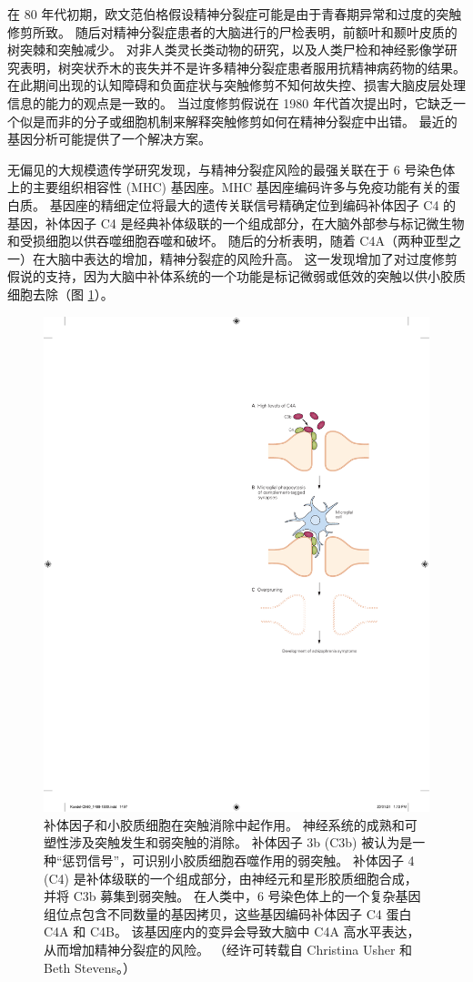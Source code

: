 在 80 年代初期，欧文范伯格假设精神分裂症可能是由于青春期异常和过度的突触修剪所致。 随后对精神分裂症患者的大脑进行的尸检表明，前额叶和颞叶皮质的树突棘和突触减少。 对非人类灵长类动物的研究，以及人类尸检和神经影像学研究表明，树突状乔木的丧失并不是许多精神分裂症患者服用抗精神病药物的结果。 在此期间出现的认知障碍和负面症状与突触修剪不知何故失控、损害大脑皮层处理信息的能力的观点是一致的。 当过度修剪假说在 1980 年代首次提出时，它缺乏一个似是而非的分子或细胞机制来解释突触修剪如何在精神分裂症中出错。 最近的基因分析可能提供了一个解决方案。

无偏见的大规模遗传学研究发现，与精神分裂症风险的最强关联在于 6 号染色体上的主要组织相容性 (MHC) 基因座。MHC 基因座编码许多与免疫功能有关的蛋白质。 基因座的精细定位将最大的遗传关联信号精确定位到编码补体因子 C4 的基因，补体因子 C4 是经典补体级联的一个组成部分，在大脑外部参与标记微生物和受损细胞以供吞噬细胞吞噬和破坏。 随后的分析表明，随着 C4A（两种亚型之一）在大脑中表达的增加，精神分裂症的风险升高。 
这一发现增加了对过度修剪假说的支持，因为大脑中补体系统的一个功能是标记微弱或低效的突触以供小胶质细胞去除（图 \ref{fig:60_7}）。

\begin{figure}[htbp]
	\centering
	\includegraphics[width=0.45\linewidth]{chap60/fig_60_7}
	\caption{补体因子和小胶质细胞在突触消除中起作用。 神经系统的成熟和可塑性涉及突触发生和弱突触的消除。 补体因子 3b (C3b) 被认为是一种“惩罚信号”，可识别小胶质细胞吞噬作用的弱突触。 补体因子 4 (C4) 是补体级联的一个组成部分，由神经元和星形胶质细胞合成，并将 C3b 募集到弱突触。 在人类中，6 号染色体上的一个复杂基因组位点包含不同数量的基因拷贝，这些基因编码补体因子 C4 蛋白 C4A 和 C4B。 该基因座内的变异会导致大脑中 C4A 高水平表达，从而增加精神分裂症的风险。 （经许可转载自 Christina Usher 和 Beth Stevens。）}
	\label{fig:60_7}
\end{figure}

